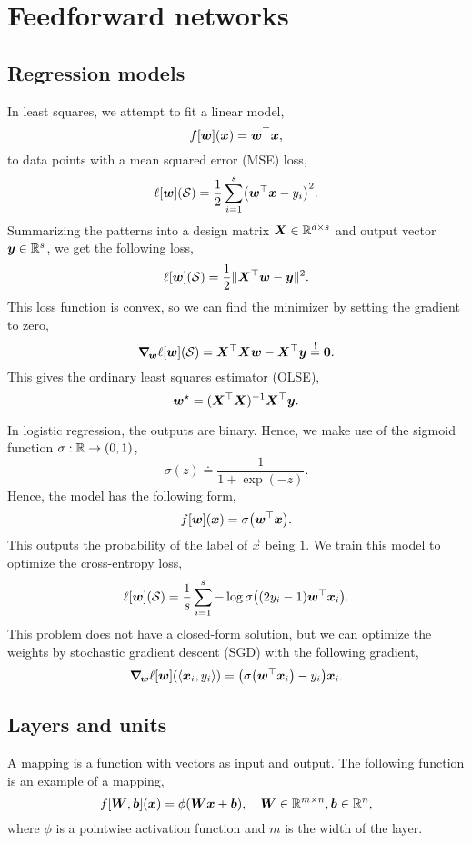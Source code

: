 \section{Feedforward networks}

\subsection{Regression models}

In least squares, we attempt to fit a linear model, \[
    f[\vec{w}](\vec{x}) = \transpose{\vec{w}}\vec{x},
\]
to data points with a mean squared error (MSE) loss, \[
    \ell[\vec{w}](\mathcal{S}) = \frac{1}{2} \sum_{i=1}^{s} \lft( \transpose{\vec{w}} \vec{x} - y_i \rgt)^2.
\]
Summarizing the patterns into a design matrix $\mat{X} \in \R^{d \times s}$ and output vector
$\vec{y} \in \R^s$, we get the following loss, \[
    \ell[\vec{w}](\mathcal{S}) = \frac{1}{2} \| \transpose{\mat{X}} \vec{w} - \vec{y} \|^2.
\]
This loss function is convex, so we can find the minimizer by setting the gradient to zero, \[
    \grad{\ell[\vec{w}](\mathcal{S})}{\vec{w}} = \transpose{\mat{X}} \mat{X} \vec{w} - \transpose{\mat{X}} \vec{y} \condeq \vec{0}.
\]
This gives the ordinary least squares estimator (OLSE), \[
    \vec{w}^\star = \inv{(\transpose{\mat{X}} \mat{X})} \transpose{\mat{X}} \vec{y}.
\]

In logistic regression, the outputs are binary. Hence, we make use of the sigmoid function $\sigma:
    \R \to (0,1)$, \[
    \sigma(z) \doteq \frac{1}{1 + \exp(-z)}.
\]
Hence, the model has the following form, \[
    f[\vec{w}](\vec{x}) = \sigma \lft( \transpose{\vec{w}}\vec{x} \rgt).
\]
This outputs the probability of the label of $\vec{x}$ being $1$. We train this model to optimize
the cross-entropy loss, \[
    \ell[\vec{w}](\mathcal{S}) = \frac{1}{s} \sum_{i=1}^{s} -\log \sigma \lft( (2y_i - 1) \transpose{\vec{w}} \vec{x}_i \rgt).
\]
This problem does not have a closed-form solution, but we can optimize the weights by stochastic
gradient descent (SGD) with the following gradient, \[
    \grad{\ell[\vec{w}](\langle \vec{x}_i, y_i \rangle)}{\vec{w}} = \lft( \sigma \lft( \transpose{\vec{w}} \vec{x}_i \rgt) - y_i \rgt) \vec{x}_i.
\]

\subsection{Layers and units}

A mapping is a function with vectors as input and output. The following function is an example of a
mapping, \[
    f[\mat{W}, \vec{b}](\vec{x}) = \phi(\mat{W} \vec{x} + \vec{b}), \quad \mat{W} \in \R^{m \times n}, \vec{b} \in \R^n,
\]
where $\phi$ is a pointwise activation function and $m$ is the width of the layer.

